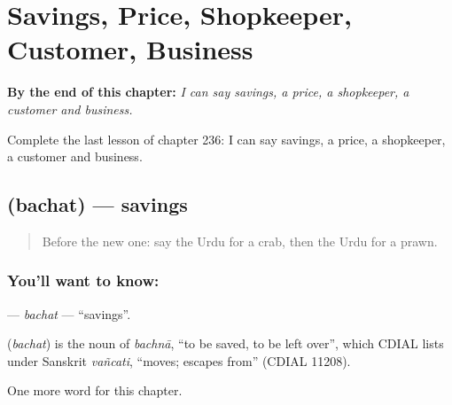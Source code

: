 
\chapter{Savings, Price, Shopkeeper, Customer, Business}
\label{ch:ur-savings-price-shopkeeper-customer-business}

\begin{chapteropening}
\textbf{By the end of this chapter:} \emph{I can say savings, a price, a shopkeeper, a customer and business.}

Complete the last lesson of chapter 236: I can say savings, a price, a shopkeeper, a customer and business.
\end{chapteropening}

\section[\texorpdfstring{\ur{بچت} (bachat)}{بچت (bachat)}]{ (bachat) — savings}

\label{lesson:UR-C236-bachat}



\begin{quote}
Before the new one: say the Urdu for a crab, then the Urdu for a prawn.
\end{quote}

\subsection*{You'll want to know: }
\textbf{} — \emph{bachat} — \textquotedblleft{}savings\textquotedblright{}.

\begin{cousinweb}
\textbf{} (\emph{bachat}) is the noun of \emph{bachnā}, \textquotedblleft{}to be saved, to be left over\textquotedblright{}, which CDIAL lists under Sanskrit \emph{vañcati}, \textquotedblleft{}moves; escapes from\textquotedblright{} (CDIAL 11208).
\end{cousinweb}

\begin{grammarlens}[title={What you've built}]
One more word for this chapter.
\end{grammarlens}

